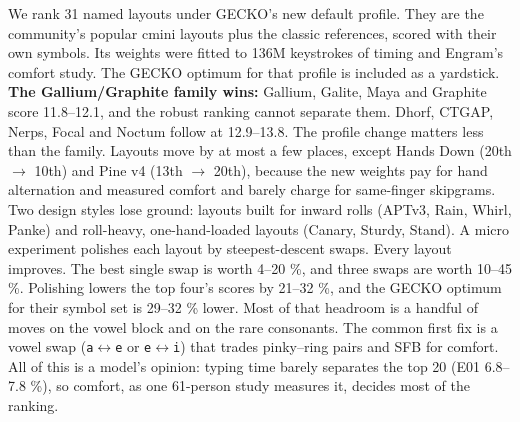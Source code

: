 \documentclass{gecko-paper}
\begin{document}
\makepapertitle
\begin{paperabstract}
We rank 31 named layouts under GECKO's new default profile. They are the community's popular cmini layouts plus the classic references, scored with their own symbols. Its weights were fitted to 136M keystrokes of timing and Engram's comfort study. The GECKO optimum for that profile is included as a yardstick. \textbf{The Gallium/Graphite family wins:} Gallium, Galite, Maya and Graphite score
11.8–12.1, and the robust ranking cannot separate them. Dhorf, CTGAP, Nerps, Focal and Noctum follow at 12.9–13.8. The profile change matters less than the family. Layouts move by at most a few places, except Hands Down (20th $\to$ 10th) and Pine v4 (13th $\to$ 20th), because the new weights pay for hand alternation and measured comfort and barely charge for same-finger skipgrams. Two design styles lose
ground: layouts built for inward rolls (APTv3, Rain, Whirl, Panke) and roll-heavy, one-hand-loaded layouts (Canary, Sturdy, Stand). A micro experiment polishes each layout by steepest-descent swaps. Every layout improves. The best single swap is worth 4–20 \%, and three swaps are worth 10–45 \%. Polishing lowers the top four's scores by 21–32 \%, and the GECKO optimum for their symbol set is
29–32 \% lower. Most of that headroom is a handful of moves on the vowel block and on the rare consonants. The common first fix is a vowel swap (\texttt{a$\leftrightarrow$e} or \texttt{e$\leftrightarrow$i}) that trades pinky–ring pairs and SFB for comfort. All of this is a model's opinion: typing time barely separates the top 20 (E01 6.8–7.8 \%), so comfort, as one 61-person study measures it, decides most of the ranking.

\end{paperabstract}
\raggedright
\end{document}
